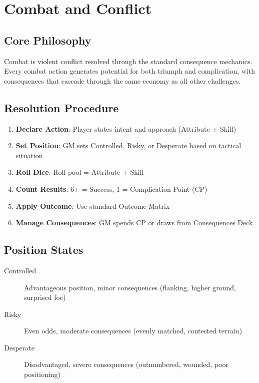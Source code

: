 \chapter{Combat and Conflict}

\section{Core Philosophy}
Combat is violent conflict resolved through the standard consequence mechanics. Every combat action generates potential for both triumph and complication, with consequences that cascade through the same economy as all other challenges.

\section{Resolution Procedure}
\begin{enumerate}
    \item \textbf{Declare Action}: Player states intent and approach (Attribute + Skill)
    \item \textbf{Set Position}: GM sets Controlled, Risky, or Desperate based on tactical situation
    \item \textbf{Roll Dice}: Roll pool = Attribute + Skill
    \item \textbf{Count Results}: 6+ = Success, 1 = Complication Point (CP)
    \item \textbf{Apply Outcome}: Use standard Outcome Matrix
    \item \textbf{Manage Consequences}: GM spends CP or draws from Consequences Deck
\end{enumerate}

\section{Position States}
\begin{description}
\item[Controlled] Advantageous position, minor consequences (flanking, higher ground, surprised foe)
\item[Risky] Even odds, moderate consequences (evenly matched, contested terrain)
\item[Desperate] Disadvantaged, severe consequences (outnumbered, wounded, poor positioning)
\end{description}

